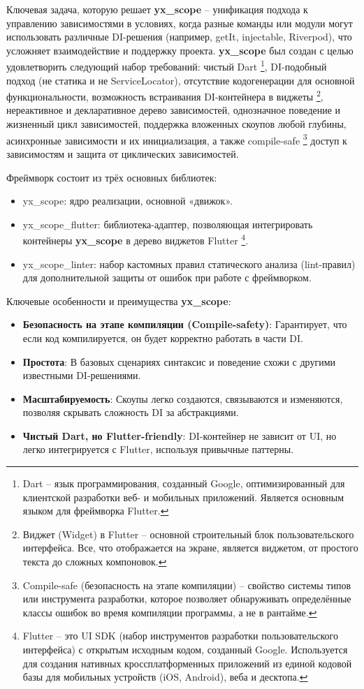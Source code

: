 Ключевая задача, которую решает \textbf{yx\_scope} – унификация подхода к управлению зависимостями в условиях, когда разные команды или модули могут использовать различные DI-решения (например, getIt, injectable, Riverpod), что усложняет взаимодействие и поддержку проекта. \textbf{yx\_scope} был создан с целью удовлетворить следующий набор требований: чистый Dart \footnote{Dart – язык программирования, созданный Google, оптимизированный для клиентской разработки веб- и мобильных приложений. Является основным языком для фреймворка Flutter.}, DI-подобный подход (не статика и не ServiceLocator), отсутствие кодогенерации для основной функциональности, возможность встраивания DI-контейнера в виджеты \footnote{Виджет (Widget) в Flutter – основной строительный блок пользовательского интерфейса. Все, что отображается на экране, является виджетом, от простого текста до сложных компоновок.}, нереактивное и декларативное дерево зависимостей, однозначное поведение и жизненный цикл зависимостей, поддержка вложенных скоупов любой глубины, асинхронные зависимости и их инициализация, а также compile-safe \footnote{Compile-safe (безопасность на этапе компиляции) – свойство системы типов или инструмента разработки, которое позволяет обнаруживать определённые классы ошибок во время компиляции программы, а не в рантайме.} доступ к зависимостям и защита от циклических зависимостей.

Фреймворк состоит из трёх основных библиотек:
\begin{itemize}
    \item yx\_scope: ядро реализации, основной «движок».
    \item yx\_scope\_flutter: библиотека-адаптер, позволяющая интегрировать контейнеры \textbf{yx\_scope} в дерево виджетов Flutter \footnote{Flutter – это UI SDK (набор инструментов разработки пользовательского интерфейса) с открытым исходным кодом, созданный Google. Используется для создания нативных кроссплатформенных приложений из единой кодовой базы для мобильных устройств (iOS, Android), веба и десктопа.}.
    \item yx\_scope\_linter: набор кастомных правил статического анализа (lint-правил) для дополнительной защиты от ошибок при работе с фреймворком.
\end{itemize}

Ключевые особенности и преимущества \textbf{yx\_scope}:
\begin{itemize}
    \item \textbf{Безопасность на этапе компиляции (Compile-safety)}: Гарантирует, что если код компилируется, он будет корректно работать в части DI.
    \item \textbf{Простота}: В базовых сценариях синтаксис и поведение схожи с другими известными DI-решениями.
    \item \textbf{Масштабируемость}: Скоупы легко создаются, связываются и изменяются, позволяя скрывать сложность DI за абстракциями.
    \item \textbf{Чистый Dart, но Flutter-friendly}: DI-контейнер не зависит от UI, но легко интегрируется с Flutter, используя привычные паттерны.
\end{itemize}

